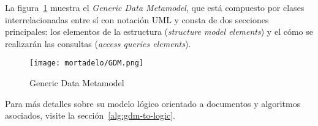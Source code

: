 La figura~\ref{img:mortadelo-gdm1} muestra el \textit{Generic Data Metamodel}, que está compuesto por clases interrelacionadas entre sí con notación UML y consta de dos secciones principales: los elementos de la estructura (\textit{structure model elements}) y el cómo se realizarán las consultas (\textit{access queries elements}).


\begin{figure}[H] 
    \centering
    \texttt{[image: mortadelo/GDM.png]}
    \caption{Generic Data Metamodel}
    \label{img:mortadelo-gdm1}
\end{figure}

Para más detalles sobre su modelo lógico orientado a documentos y algoritmos asociados, visite la sección~\ref{alg:gdm-to-logic}.
